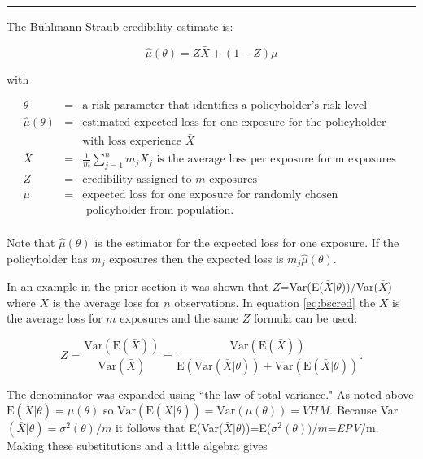 \documentclass[]{book}
\theoremstyle{definition}
\theoremstyle{definition}
\theoremstyle{definition}
\theoremstyle{remark}
\begin{document}
\begin{center}\rule{0.5\linewidth}{\linethickness}\end{center}

The Bühlmann-Straub credibility estimate is:

\begin{equation}\hat{\mu}(\theta)=Z\bar{X}+(1-Z)\mu 
\label{eq:bscred} 
\end{equation}

with

\begin{eqnarray*} 
\theta&=&\textrm{a risk parameter that identifies a policyholder's risk level}\\
\hat{\mu}(\theta)&=&\textrm{estimated expected loss for one exposure for the policyholder}\\
 & & \textrm{with loss experience } \bar{X}\\
\bar{X}&=& \frac{1}{m} \sum_{j=1}^{n} m_j X_j \textrm{ is the average loss per exposure for m exposures } \\
Z&=&\textrm{credibility assigned to $m$ exposures } \\
 \mu&=&\textrm{expected loss for one exposure for randomly chosen}\\
 & & \textrm{ policyholder from population.}\\
\end{eqnarray*}

Note that \(\hat{\mu}(\theta)\) is the estimator for the expected loss
for one exposure. If the policyholder has \(m_j\) exposures then the
expected loss is \(m_j\hat{\mu}(\theta)\).

In an example in the prior section it was shown that
\(Z\)=Var(E(\(\bar{X}|\theta\)))/Var(\(\bar{X}\)) where \(\bar{X}\) is
the average loss for \(n\) observations. In equation \eqref{eq:bscred} the
\(\bar{X}\) is the average loss for \(m\) exposures and the same \(Z\)
formula can be used:

\begin{equation*} 
Z=\frac{\mathrm{Var}(\mathrm{E}(\bar{X}))}{\mathrm{Var}(\bar{X})}=
\frac{\mathrm{Var}(\mathrm{E}(\bar{X}))}{\mathrm{E}(\mathrm{Var}(\bar{X}|\theta))+\mathrm{Var}(\mathrm{E}(\bar{X}|\theta))}. 
\end{equation*}

The denominator was expanded using ``the law of total variance." As
noted above \(\mathrm{E}(\bar{X}|\theta)=\mu(\theta)\) so
\(\mathrm{Var}(\mathrm{E}(\bar{X}|\theta))=\mathrm{Var}(\mu(\theta))=VHM\).
Because Var\((\bar{X}|\theta)=\sigma^2(\theta)/m\) it follows that
E(Var(\(\bar{X}|\theta\)))=E(\(\sigma^2(\theta))/m\)=\emph{EPV}/m.
Making these substitutions and a little algebra gives
\end{document}

